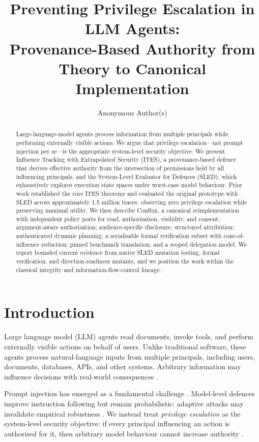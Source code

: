 \documentclass{article}
\title{Preventing Privilege Escalation in LLM Agents:\\
Provenance-Based Authority from Theory to Canonical Implementation}
\author{%
  Anonymous Author(s) \\
}
\begin{document}
\maketitle

\begin{abstract}
Large-language-model agents process information from multiple principals
while performing externally visible actions. We argue that privilege
escalation---not prompt injection per se---is the appropriate system-level
security objective. We present Influence Tracking with Extrapolated Security
(ITES), a provenance-based defence that derives effective authority from the
intersection of permissions held by all influencing principals, and the
System-Level Evaluator for Defences (SLED), which exhaustively explores
execution state spaces under worst-case model behaviour. Prior work
established the core ITES theorems and evaluated the original prototype with
SLED across approximately 1.5 million traces, observing zero privilege
escalation while preserving maximal utility. We then describe Conflux, a
canonical reimplementation with independent policy ports for read,
authorisation, visibility, and consent; argument-aware authorisation;
audience-specific disclosure; structured attribution; authenticated dynamic
planning; a serialisable formal verification subset with cone-of-influence
reduction; pinned benchmark translation; and a scoped delegation model. We
report bounded current evidence from native SLED mutation testing, formal
verification, and direction-readiness mutants, and we position the work
within the classical integrity and information-flow-control lineage.
\end{abstract}


\section{Introduction}

Large language model (LLM) agents read documents, invoke tools, and perform
externally visible actions on behalf of users. Unlike traditional software,
these agents process natural-language inputs from multiple principals,
including users, documents, databases, APIs, and other systems. Arbitrary
information may influence decisions with real-world consequences
\citep{earlycategorization}.

Prompt injection has emerged as a fundamental challenge
\citep{struq,spotlighting,neuralexec}. Model-level defences improve
instruction following but remain probabilistic: adaptive attacks may
invalidate empirical robustness
\citep{criticaleval,detectprompt,poisoningalignment,checkpointgcg}. We
instead treat \emph{privilege escalation} as the system-level security
objective: if every principal influencing an action is authorised for it,
then arbitrary model behaviour cannot increase authority
\citep{provos2003,davi2010}.
\end{document}
